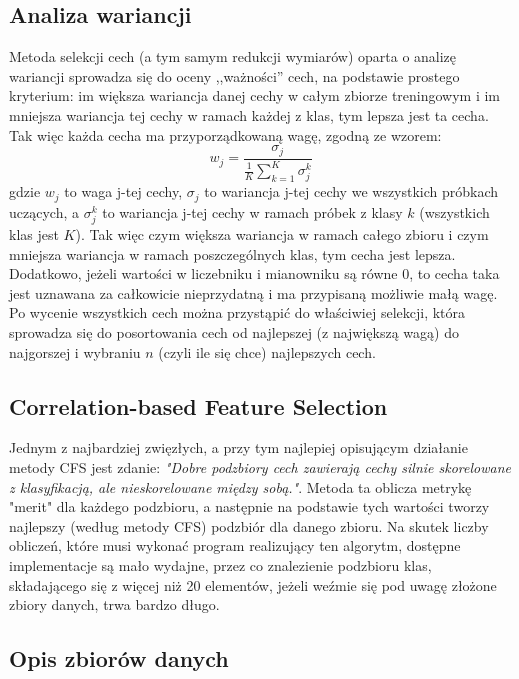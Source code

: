 \documentclass{classrep}
\begin{document}
{        \subsection{Analiza wariancji} {
            Metoda selekcji cech (a tym samym redukcji wymiarów) oparta o analizę wariancji sprowadza się do oceny ,,ważności'' cech, na podstawie prostego kryterium: im większa wariancja danej cechy w całym zbiorze treningowym i im mniejsza wariancja tej cechy w ramach każdej z klas, tym lepsza jest ta cecha. Tak więc każda cecha ma przyporządkowaną wagę, zgodną ze wzorem:
            \begin{equation}
                    w_j = \frac{\sigma_j}{\frac{1}{K} \sum_{k=1}^{K} \sigma_{j}^{k}}
            \end{equation}
            gdzie $w_j$ to waga j-tej cechy, $\sigma_j$ to wariancja j-tej cechy we wszystkich próbkach uczących, a $\sigma_{j}^{k}$ to wariancja j-tej cechy w ramach próbek z klasy $k$ (wszystkich klas jest $K$). Tak więc czym większa wariancja w ramach całego zbioru i czym mniejsza wariancja w ramach poszczególnych klas, tym cecha jest lepsza. Dodatkowo, jeżeli wartości w liczebniku i mianowniku są równe $0$, to cecha taka jest uznawana za całkowicie nieprzydatną i ma przypisaną możliwie małą wagę. Po wycenie wszystkich cech można przystąpić do właściwiej selekcji, która sprowadza się do posortowania cech od najlepszej (z największą wagą) do najgorszej i wybraniu $n$ (czyli ile się chce) najlepszych cech.
        }
     \subsection{Correlation-based Feature Selection} {
     Jednym z najbardziej zwięzłych, a przy tym najlepiej opisującym działanie metody CFS jest zdanie: \textit{"Dobre podzbiory cech zawierają cechy silnie skorelowane z klasyfikacją, ale nieskorelowane między sobą."}. Metoda ta oblicza metrykę "merit" dla każdego podzbioru, a następnie na podstawie tych wartości tworzy najlepszy (według metody CFS) podzbiór dla danego zbioru. Na skutek liczby obliczeń, które musi wykonać program realizujący ten algorytm, dostępne implementacje są mało wydajne, przez co znalezienie podzbioru klas, składającego się z więcej niż 20 elementów, jeżeli weźmie się pod uwagę złożone zbiory danych, trwa bardzo długo.
    }
        \subsection{Opis zbiorów danych}
        \label{opis_zbiorow_intro} {

}}
\end{document}
